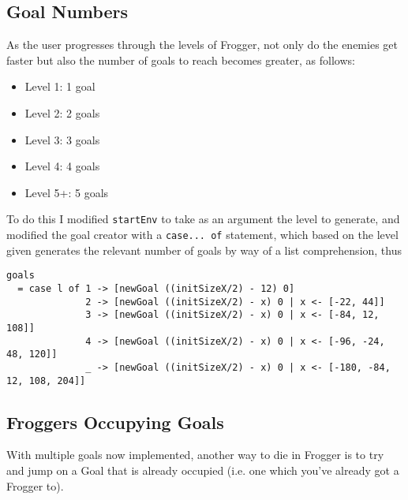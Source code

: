 \documentclass[12pt, a4paper]{report}
\begin{document}
\subsection{Goal Numbers}

As the user progresses through the levels of Frogger, not only do the enemies get faster but also the number of goals to reach becomes greater, as follows:

\begin{itemize}
  \item Level 1: 1 goal
  \item Level 2: 2 goals
  \item Level 3: 3 goals
  \item Level 4: 4 goals
  \item Level 5+: 5 goals
\end{itemize}

To do this I modified \verb|startEnv| to take as an argument the level to generate, and modified the goal creator with a \verb|case... of| statement, which based on the level given generates the relevant number of goals by way of a list comprehension, thus

\begin{lstlisting}
goals
  = case l of 1 -> [newGoal ((initSizeX/2) - 12) 0]
              2 -> [newGoal ((initSizeX/2) - x) 0 | x <- [-22, 44]]
              3 -> [newGoal ((initSizeX/2) - x) 0 | x <- [-84, 12, 108]]
              4 -> [newGoal ((initSizeX/2) - x) 0 | x <- [-96, -24, 48, 120]]
              _ -> [newGoal ((initSizeX/2) - x) 0 | x <- [-180, -84, 12, 108, 204]]
\end{lstlisting}

\subsection{Froggers Occupying Goals}

With multiple goals now implemented, another way to die in Frogger is to try and jump on a Goal that is already occupied (i.e. one which you've already got a Frogger to).
\end{document}

